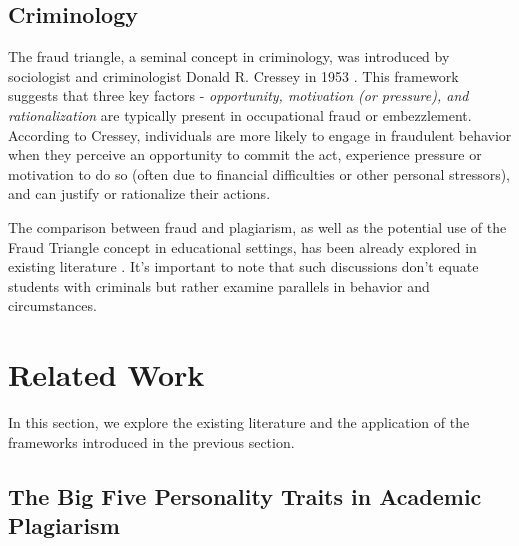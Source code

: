 \subsection{Criminology}
The fraud triangle, a seminal concept in criminology, was introduced by sociologist and criminologist Donald R. Cressey in 1953 \cite{Cressey}. This framework suggests that three key factors - \textit{opportunity, motivation (or pressure), and rationalization} are typically present in occupational fraud or embezzlement. According to Cressey, individuals are more likely to engage in fraudulent behavior when they perceive an opportunity to commit the act, experience pressure or motivation to do so (often due to financial difficulties or other personal stressors), and can justify or rationalize their actions. 

The comparison between fraud and plagiarism, as well as the potential use of the Fraud Triangle concept in educational settings, has been already explored in existing literature \cite{fraudTriangleToAcadmics, FraudTriEffect}. It's important to note that such discussions don't equate students with criminals but rather examine parallels in behavior and circumstances.


\section{Related Work} \label{sec:relatedwork}
In this section, we explore the existing literature and the application of the frameworks introduced in the previous section. \vspace{-0.2cm}

\subsection{The Big Five Personality Traits in Academic Plagiarism}

